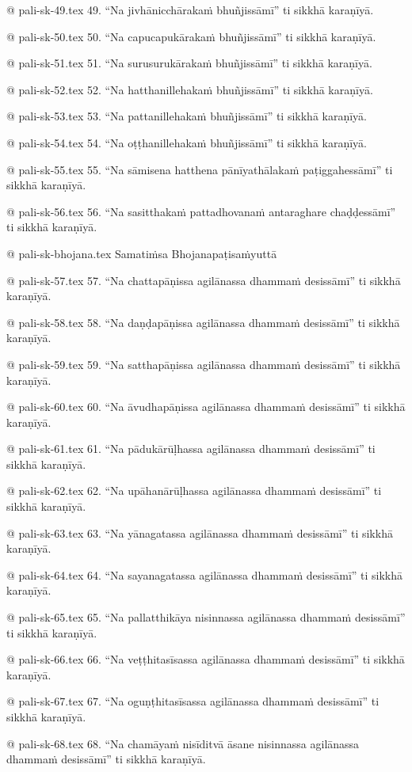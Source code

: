 @ pali-sk-49.tex
49. “Na jivhānicchārakaṁ bhuñjissāmī” ti sikkhā karaṇīyā.

@ pali-sk-50.tex
50. “Na capucapukārakaṁ bhuñjissāmī” ti sikkhā karaṇīyā.

@ pali-sk-51.tex
51. “Na surusurukārakaṁ bhuñjissāmī” ti sikkhā karaṇīyā.

@ pali-sk-52.tex
52. “Na hatthanillehakaṁ bhuñjissāmī” ti sikkhā karaṇīyā.

@ pali-sk-53.tex
53. “Na pattanillehakaṁ bhuñjissāmī” ti sikkhā karaṇīyā.

@ pali-sk-54.tex
54. “Na oṭṭhanillehakaṁ bhuñjissāmī” ti sikkhā karaṇīyā.

@ pali-sk-55.tex
55. “Na sāmisena hatthena pānīyathālakaṁ paṭiggahessāmī” ti sikkhā karaṇīyā.

@ pali-sk-56.tex
56. “Na sasitthakaṁ pattadhovanaṁ antaraghare chaḍḍessāmī” ti sikkhā karaṇīyā.

@ pali-sk-bhojana.tex
Samatiṁsa Bhojanapaṭisaṁyuttā

@ pali-sk-57.tex
57. “Na chattapāṇissa agilānassa dhammaṁ desissāmī” ti sikkhā karaṇīyā.

@ pali-sk-58.tex
58. “Na daṇḍapāṇissa agilānassa dhammaṁ desissāmī” ti sikkhā karaṇīyā.

@ pali-sk-59.tex
59. “Na satthapāṇissa agilānassa dhammaṁ desissāmī” ti sikkhā karaṇīyā.

@ pali-sk-60.tex
60. “Na āvudhapāṇissa agilānassa dhammaṁ desissāmī” ti sikkhā karaṇīyā.

@ pali-sk-61.tex
61. “Na pādukārūḷhassa agilānassa dhammaṁ desissāmī” ti sikkhā karaṇīyā.

@ pali-sk-62.tex
62. “Na upāhanārūḷhassa agilānassa dhammaṁ desissāmī” ti sikkhā karaṇīyā.

@ pali-sk-63.tex
63. “Na yānagatassa agilānassa dhammaṁ desissāmī” ti sikkhā karaṇīyā.

@ pali-sk-64.tex
64. “Na sayanagatassa agilānassa dhammaṁ desissāmī” ti sikkhā karaṇīyā.

@ pali-sk-65.tex
65. “Na pallatthikāya nisinnassa agilānassa dhammaṁ desissāmī” ti sikkhā karaṇīyā.

@ pali-sk-66.tex
66. “Na veṭṭhitasīsassa agilānassa dhammaṁ desissāmī” ti sikkhā karaṇīyā.

@ pali-sk-67.tex
67. “Na oguṇṭhitasīsassa agilānassa dhammaṁ desissāmī” ti sikkhā karaṇīyā.

@ pali-sk-68.tex
68. “Na chamāyaṁ nisīditvā āsane nisinnassa agilānassa dhammaṁ desissāmī” ti sikkhā karaṇīyā.

